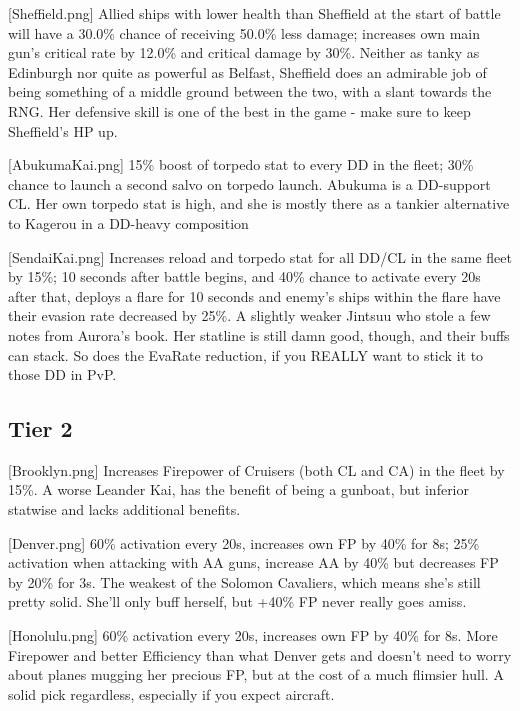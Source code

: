 [Sheffield.png]
{Allied ships with lower health than Sheffield at the start of battle will have a 30.0\% chance of receiving 50.0\% less damage; increases own main gun's critical rate by 12.0\% and critical damage by 30\%.}
{}
{Neither as tanky as Edinburgh nor quite as powerful as Belfast, Sheffield does an admirable job of being something of a middle ground between the two, with a slant towards the RNG. Her defensive skill is one of the best in the game - make sure to keep Sheffield's HP up.}
 
[AbukumaKai.png]
{15\% boost of torpedo stat to every DD in the fleet; 30\% chance to launch a second salvo on torpedo launch.}
{}
{Abukuma is a DD-support CL. Her own torpedo stat is high, and she is mostly there as a tankier alternative to Kagerou in a DD-heavy composition}

[SendaiKai.png]
{Increases reload and torpedo stat for all DD/CL in the same fleet by 15\%; 10 seconds after battle begins, and 40\% chance to activate every 20s after that, deploys a flare for 10 seconds and enemy's ships within the flare have their evasion rate decreased by 25\%. }
{}
{A slightly weaker Jintsuu who stole a few notes from Aurora's book. Her statline is still damn good, though, and their buffs can stack. So does the EvaRate reduction, if you REALLY want to stick it to those DD in PvP.}


\newpage
\subsection{Tier 2}
[Brooklyn.png]
{Increases Firepower of Cruisers (both CL and CA) in the fleet by 15\%.}
{}
{A worse Leander Kai, has the benefit of being a gunboat, but inferior statwise and lacks additional benefits.}
 
[Denver.png]
{60\% activation every 20s, increases own FP by 40\% for 8s; 25\% activation when attacking with AA guns, increase AA by 40\% but decreases FP by 20\% for 3s.}
{}
{The weakest of the Solomon Cavaliers, which means she's still pretty solid. She'll only buff herself, but +40\% FP never really goes amiss.}

[Honolulu.png]
{60\% activation every 20s, increases own FP by 40\% for 8s.}
{}
{More Firepower and better Efficiency than what Denver gets and doesn't need to worry about planes mugging her precious FP, but at the cost of a much flimsier hull. A solid pick regardless, especially if you expect aircraft.}

